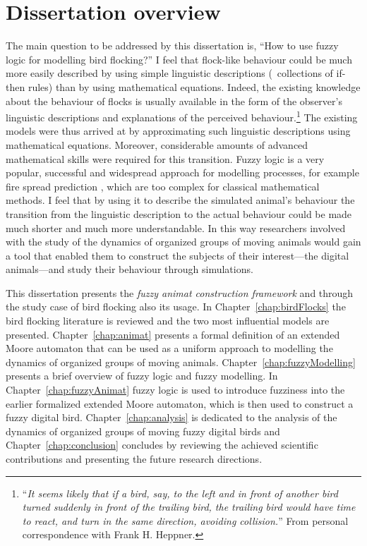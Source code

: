 \section{Dissertation overview}
The main question to be addressed by this dissertation is, ``How to use fuzzy logic for modelling bird flocking?'' I feel that flock-like behaviour could be much more easily described by using simple linguistic descriptions (\eg\ collections of if-then rules) than by using mathematical equations. Indeed, the existing knowledge about the behaviour of flocks is usually available in the form of the observer's linguistic descriptions and explanations of the perceived behaviour.\footnote{``\emph{It seems likely that if a bird, say, to the left and in front of another bird turned suddenly in front of the trailing bird, the trailing bird would have time to react, and turn in the same direction, avoiding collision.}'' From personal correspondence with Frank H. Heppner.} The existing models were thus arrived at by approximating such linguistic descriptions using mathematical equations. Moreover, considerable amounts of advanced mathematical skills were required for this transition. Fuzzy logic \cite{zadeh:1965} is a very popular, successful and widespread approach for modelling processes, for example fire spread prediction \cite{mraz:1999,vakalis:2004a,vakalis:2004b}, which are too complex for classical mathematical methods. I feel that by using it to describe the simulated animal's behaviour the transition from the linguistic description to the actual behaviour could be made much shorter and much more understandable. In this way researchers involved with the study of the dynamics of organized groups of moving animals would gain a tool that enabled them to construct the subjects of their interest---the digital animals---and study their behaviour through simulations.

This dissertation presents the \emph{fuzzy animat construction framework} and through the study case of bird flocking also its usage. In Chapter~\ref{chap:birdFlocks} the bird flocking literature is reviewed and the two most influential models are presented. Chapter~\ref{chap:animat} presents a formal definition of an extended Moore automaton that can be used as a uniform approach to modelling the dynamics of organized groups of moving animals. Chapter~\ref{chap:fuzzyModelling} presents a brief overview of fuzzy logic and fuzzy modelling. In Chapter~\ref{chap:fuzzyAnimat} fuzzy logic is used to introduce fuzziness into the earlier formalized extended Moore automaton, which is then used to construct a fuzzy digital bird. Chapter~\ref{chap:analysis} is dedicated to the analysis of the dynamics of organized groups of moving fuzzy digital birds and Chapter~\ref{chap:conclusion} concludes by reviewing the achieved scientific contributions and presenting the future research directions.

